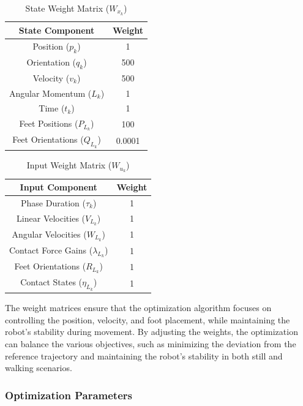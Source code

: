 \documentclass[main.tex]{subfiles}
\begin{document}
\begin{table}[htbp]
\centering
\renewcommand{\arraystretch}{1.5} %
\begin{tabular}{|c|c|}
\hline
\textbf{State Component} & \textbf{Weight} \\ \hline
Position (\(p_k\)) & 1 \\ \hline
Orientation (\(q_k\)) & 500 \\ \hline
Velocity (\(v_k\)) & 500 \\ \hline
Angular Momentum (\(L_k\)) & 1 \\ \hline
Time (\(t_k\)) & 1 \\ \hline
Feet Positions (\(P_{L_k}\)) & 100 \\ \hline
Feet Orientations (\(Q_{L_k}\)) & 0.0001 \\ \hline
\end{tabular}
\caption{State Weight Matrix (\(W_{x_k}\))}
\label{tab:state_weights}
\end{table}

\begin{table}[htbp]
\centering
\renewcommand{\arraystretch}{1.5} %
\begin{tabular}{|c|c|}
\hline
\textbf{Input Component} & \textbf{Weight} \\ \hline
Phase Duration (\(\tau_k\)) & 1 \\ \hline
Linear Velocities (\(V_{L_k}\)) & 1 \\ \hline
Angular Velocities (\(W_{L_k}\)) & 1 \\ \hline
Contact Force Gains (\(\lambda_{L_k}\)) & 1 \\ \hline
Feet Orientations (\(R_{L_k}\)) & 1 \\ \hline
Contact States (\(\eta_{L_k}\)) & 1 \\ \hline
\end{tabular}
\caption{Input Weight Matrix (\(W_{u_k}\))}
\label{tab:input_weights}
\end{table}

The weight matrices ensure that the optimization algorithm focuses on controlling the position, velocity, and foot placement, while maintaining the robot's stability during movement. By adjusting the weights, the optimization can balance the various objectives, such as minimizing the deviation from the reference trajectory and maintaining the robot's stability in both still and walking scenarios.

\subsubsection*{Optimization Parameters}
\end{document}
